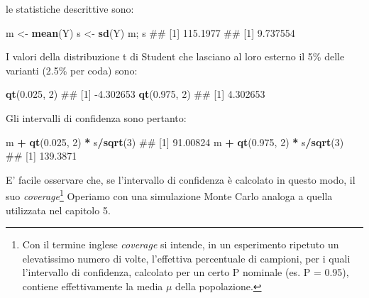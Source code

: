 \documentclass[a4paper,12pt,oneside]{book}
\newenvironment{Shaded}{\begin{snugshade}}{\end{snugshade}}
\newcommand{\KeywordTok}[1]{\textcolor[rgb]{0.13,0.29,0.53}{\textbf{#1}}}
\newcommand{\DecValTok}[1]{\textcolor[rgb]{0.00,0.00,0.81}{#1}}
\newcommand{\FloatTok}[1]{\textcolor[rgb]{0.00,0.00,0.81}{#1}}
\newcommand{\StringTok}[1]{\textcolor[rgb]{0.31,0.60,0.02}{#1}}
\newcommand{\OperatorTok}[1]{\textcolor[rgb]{0.81,0.36,0.00}{\textbf{#1}}}
\newcommand{\NormalTok}[1]{#1}
\theoremstyle{definition}
\theoremstyle{definition}
\theoremstyle{definition}
\theoremstyle{remark}
\begin{document}
le statistiche descrittive sono:

\begin{Shaded}
\begin{Highlighting}[]
\NormalTok{m <-}\StringTok{ }\KeywordTok{mean}\NormalTok{(Y)}
\NormalTok{s <-}\StringTok{ }\KeywordTok{sd}\NormalTok{(Y)}
\NormalTok{m; s}
\NormalTok{## [1] 115.1977}
\NormalTok{## [1] 9.737554}
\end{Highlighting}
\end{Shaded}

I valori della distribuzione t di Student che lasciano al loro esterno
il 5\% delle varianti (2.5\% per coda) sono:

\begin{Shaded}
\begin{Highlighting}[]
\KeywordTok{qt}\NormalTok{(}\FloatTok{0.025}\NormalTok{, }\DecValTok{2}\NormalTok{)}
\NormalTok{## [1] -4.302653}
\KeywordTok{qt}\NormalTok{(}\FloatTok{0.975}\NormalTok{, }\DecValTok{2}\NormalTok{)}
\NormalTok{## [1] 4.302653}
\end{Highlighting}
\end{Shaded}

Gli intervalli di confidenza sono pertanto:

\begin{Shaded}
\begin{Highlighting}[]
\NormalTok{m }\OperatorTok{+}\StringTok{ }\KeywordTok{qt}\NormalTok{(}\FloatTok{0.025}\NormalTok{, }\DecValTok{2}\NormalTok{) }\OperatorTok{*}\StringTok{ }\NormalTok{s}\OperatorTok{/}\KeywordTok{sqrt}\NormalTok{(}\DecValTok{3}\NormalTok{)}
\NormalTok{## [1] 91.00824}
\NormalTok{m }\OperatorTok{+}\StringTok{ }\KeywordTok{qt}\NormalTok{(}\FloatTok{0.975}\NormalTok{, }\DecValTok{2}\NormalTok{) }\OperatorTok{*}\StringTok{ }\NormalTok{s}\OperatorTok{/}\KeywordTok{sqrt}\NormalTok{(}\DecValTok{3}\NormalTok{)}
\NormalTok{## [1] 139.3871}
\end{Highlighting}
\end{Shaded}

E' facile osservare che, se l'intervallo di confidenza è calcolato in
questo modo, il suo \emph{coverage}\footnote{Con il termine inglese
  \emph{coverage} si intende, in un esperimento ripetuto un elevatissimo
  numero di volte, l'effettiva percentuale di campioni, per i quali
  l'intervallo di confidenza, calcolato per un certo P nominale (es. P =
  0.95), contiene effettivamente la media \(\mu\) della popolazione.}
Operiamo con una simulazione Monte Carlo analoga a quella utilizzata nel
capitolo 5.
\end{document}
